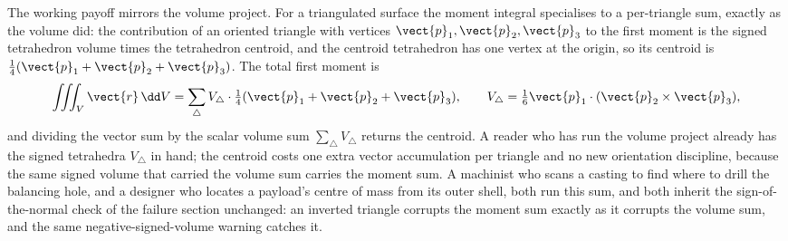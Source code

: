 The working payoff mirrors the volume project. For a triangulated
surface the moment integral specialises to a per-triangle sum, exactly
as the volume did: the contribution of an oriented triangle with
vertices $\vect{p}_{1}, \vect{p}_{2}, \vect{p}_{3}$ to the first moment
is the signed tetrahedron volume times the tetrahedron centroid, and the
centroid tetrahedron has one vertex at the origin, so its centroid is
$\tfrac{1}{4}(\vect{p}_{1} + \vect{p}_{2} + \vect{p}_{3})$. The total
first moment is
\[
\iiint_{V}\vect{r}\,\dd V = \sum_{\triangle}V_{\triangle}\cdot
\tfrac{1}{4}(\vect{p}_{1} + \vect{p}_{2} + \vect{p}_{3}),
\qquad
V_{\triangle} = \tfrac{1}{6}\vect{p}_{1}\cdot(\vect{p}_{2}\times
\vect{p}_{3}),
\]
and dividing the vector sum by the scalar volume sum
$\sum_{\triangle}V_{\triangle}$ returns the centroid. A reader who has
run the volume project already has the signed tetrahedra $V_{\triangle}$
in hand; the centroid costs one extra vector accumulation per triangle
and no new orientation discipline, because the same signed volume that
carried the volume sum carries the moment sum. A machinist who scans a
casting to find where to drill the balancing hole, and a designer who
locates a payload's centre of mass from its outer shell, both run this
sum, and both inherit the sign-of-the-normal check of the failure
section unchanged: an inverted triangle corrupts the moment sum exactly
as it corrupts the volume sum, and the same negative-signed-volume
warning catches it.

